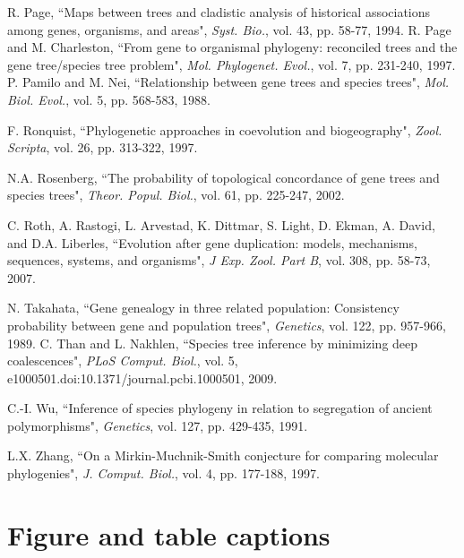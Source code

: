 \documentclass[9.5pt,journal,letterpaper,compsoc]{IEEEtran}
\begin{document}
\begin{thebibliography}{99}
R. Page,  ``Maps between trees and cladistic analysis of historical
associations among genes, organisms, and areas", {\it Syst. Bio.},
vol. 43, pp. 58-77, 1994.
%
R. Page and   M. Charleston,  ``From gene to organismal phylogeny:
reconciled trees and the gene tree/species tree problem", {\it Mol.
Phylogenet. Evol.}, vol. 7, pp. 231-240, 1997.
%
P. Pamilo and M. Nei,  ``Relationship between gene trees and species
trees", {\it Mol. Biol. Evol.}, vol. 5, pp. 568-583, 1988.

F. Ronquist,  ``Phylogenetic approaches in coevolution and
biogeography",  {\it Zool. Scripta}, vol.  26, pp.  313-322, 1997.

N.A. Rosenberg, ``The probability of topological concordance of gene
trees and species trees", {\it Theor. Popul. Biol.}, vol.  61, pp.
225-247, 2002.


C. Roth, A. Rastogi, L. Arvestad, K. Dittmar, S. Light, D. Ekman, A.
David, and D.A. Liberles,
 ``Evolution after gene duplication: models, mechanisms,
sequences, systems, and organisms",  {\it J Exp. Zool. Part B}, vol.
308, pp.  58-73, 2007.


 N. Takahata,
 ``Gene genealogy in three related population:
 Consistency probability between gene and population trees",
{\it Genetics}, vol. 122, pp. 957-966, 1989.
%
C. Than and L. Nakhlen,  ``Species tree inference by minimizing deep
coalescences",  {\it PLoS Comput. Biol.}, vol. 5,
e1000501.doi:10.1371/journal.pcbi.1000501, 2009.

%
 C.-I. Wu,
``Inference of species phylogeny in relation to segregation of
ancient polymorphisms",  {\it Genetics}, vol. 127, pp. 429-435,
1991.

L.X. Zhang,
 ``On a Mirkin-Muchnik-Smith conjecture for comparing
molecular phylogenies",  {\it J. Comput. Biol.},  vol. 4, pp.
177-188, 1997.

\end{thebibliography}

\newpage


\section*{Figure and table captions}
\end{document}
